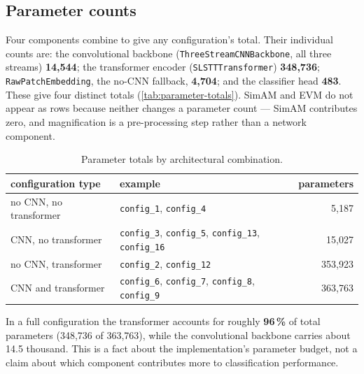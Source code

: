 \subsection{Parameter counts}
\label{sec:parameter-counts}

Four components combine to give any configuration's total. Their individual counts are: the convolutional backbone (\texttt{ThreeStreamCNNBackbone}, all three streams) \textbf{14,544}; the transformer encoder (\texttt{SLSTTTransformer}) \textbf{348,736}; \texttt{RawPatchEmbedding}, the no-CNN fallback, \textbf{4,704}; and the classifier head \textbf{483}. These give four distinct totals (\autoref{tab:parameter-totals}). SimAM and EVM do not appear as rows because neither changes a parameter count --- SimAM contributes zero, and magnification is a pre-processing step rather than a network component.

\begin{table}[htbp]
	\centering
	\begin{tabular}{l l r}
		\hline
		\textbf{configuration type} & \textbf{example} & \textbf{parameters} \\
		\hline
		no CNN, no transformer & \texttt{config\_1}, \texttt{config\_4} & 5,187 \\
		CNN, no transformer    & \texttt{config\_3}, \texttt{config\_5}, \texttt{config\_13}, \texttt{config\_16} & 15,027 \\
		no CNN, transformer    & \texttt{config\_2}, \texttt{config\_12} & 353,923 \\
		CNN and transformer    & \texttt{config\_6}, \texttt{config\_7}, \texttt{config\_8}, \texttt{config\_9} & 363,763 \\
		\hline
	\end{tabular}
	\caption[Parameter totals by architectural combination]{Parameter totals by architectural combination.}
	\label{tab:parameter-totals}
\end{table}

In a full configuration the transformer accounts for roughly \textbf{96\,\%} of total parameters (348,736 of 363,763), while the convolutional backbone carries about 14.5 thousand. This is a fact about the implementation's parameter budget, not a claim about which component contributes more to classification performance.
